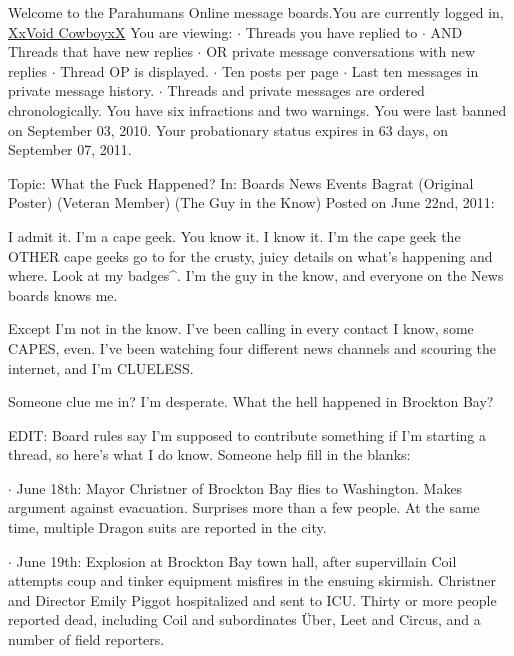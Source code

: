





Welcome to the Parahumans Online message boards.You are currently logged in, \underline{XxVoid CowboyxX}
You are viewing:
$\cdot$  Threads you have replied to
$\cdot$  AND Threads that have new replies
$\cdot$  OR private message conversations with new replies
$\cdot$  Thread OP is displayed.
$\cdot$  Ten posts per page
$\cdot$  Last ten messages in private message history.
$\cdot$  Threads and private messages are ordered chronologically.
You have six infractions and two warnings.  You were last banned on September 03, 2010.  Your probationary status expires in 63 days, on September 07, 2011.



\sectionbreak



\blacklozenge  Topic:  What the Fuck Happened?
In:  Boards \blacktriangleright News \blacktriangleright Events \blacktrianglerightAmerica
Bagrat (Original Poster) (Veteran Member) (The Guy in the Know)
Posted on June 22nd, 2011:



I admit it.  I'm a cape geek.  You know it.  I know it.  I'm the cape geek the OTHER cape geeks go to for the crusty, juicy details on what's happening and where.  Look at my badges^.  I'm the guy in the know, and everyone on the News boards knows me.



Except I'm not in the know.  I've been calling in every contact I know, some CAPES, even.  I've been watching four different news channels and scouring the internet, and I'm CLUELESS.



Someone clue me in?  I'm desperate.  What the hell happened in Brockton Bay?



EDIT:  Board rules say I'm supposed to contribute something if I'm starting a thread, so here's what I do know.  Someone help fill in the blanks:



$\cdot$  June 18th:  Mayor Christner of Brockton Bay flies to Washington.  Makes argument against evacuation.  Surprises more than a few people.  At the same time, multiple Dragon suits are reported in the city.



$\cdot$  June 19th:  Explosion at Brockton Bay town hall, after supervillain Coil attempts coup and tinker equipment misfires in the ensuing skirmish.  Christner and Director Emily Piggot hospitalized and sent to ICU.  Thirty or more people reported dead, including Coil and subordinates \"{U}ber, Leet and Circus, and a number of field reporters.



